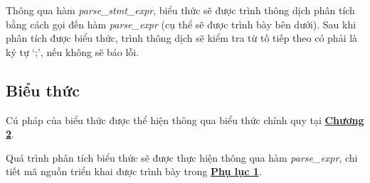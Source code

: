 Thông qua hàm \textit{parse\_stmt\_expr}, biểu thức sẽ được trình thông dịch phân tích bằng cách gọi đến hàm \textit{parse\_expr} (cụ thể sẽ được trình bày bên dưới). Sau khi phân tích được biểu thức, trình thông dịch sẽ kiểm tra từ tố tiếp theo có phải là ký tự `;', nếu không sẽ báo lỗi.

\subsection{Biểu thức}
Cú pháp của biểu thức được thể hiện thông qua biểu thức chính quy tại \hyperref[ch2:expr]{\bf Chương 2}.

Quá trình phân tích biểu thức sẽ được thực hiện thông qua hàm \textit{parse\_expr}, chi tiết mã nguồn triển khai được trình bày trong \hyperref[ap1:expr]{\bf Phụ lục 1}. %

